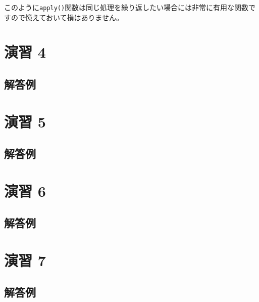 \documentclass[
  12pt,
]{book}
\begin{document}
このように\texttt{apply()}関数は同じ処理を繰り返したい場合には非常に有用な関数ですので憶えておいて損はありません。

\hypertarget{ux6f14ux7fd2-4-2}{%
\section*{演習 4}\label{ux6f14ux7fd2-4-2}}

\hypertarget{ux89e3ux7b54ux4f8b-3}{%
\subsection*{解答例}\label{ux89e3ux7b54ux4f8b-3}}

\hypertarget{ux6f14ux7fd2-5-1}{%
\section*{演習 5}\label{ux6f14ux7fd2-5-1}}

\hypertarget{ux89e3ux7b54ux4f8b-4}{%
\subsection*{解答例}\label{ux89e3ux7b54ux4f8b-4}}

\hypertarget{ux6f14ux7fd2-6-1}{%
\section*{演習 6}\label{ux6f14ux7fd2-6-1}}

\hypertarget{ux89e3ux7b54ux4f8b-5}{%
\subsection*{解答例}\label{ux89e3ux7b54ux4f8b-5}}

\hypertarget{ux6f14ux7fd2-7-2}{%
\section*{演習 7}\label{ux6f14ux7fd2-7-2}}

\hypertarget{ux89e3ux7b54ux4f8b-6}{%
\subsection*{解答例}\label{ux89e3ux7b54ux4f8b-6}}
\end{document}
